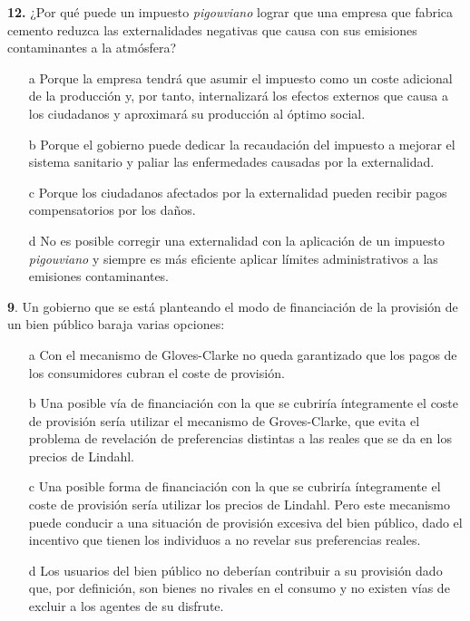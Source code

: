 \documentclass{nuevotema}
\begin{document}
\preguntas


\textbf{12.} ¿Por qué puede un impuesto \textit{pigouviano} lograr que una empresa que fabrica cemento reduzca las externalidades negativas que causa con sus emisiones contaminantes a la atmósfera?

\begin{itemize}
	\item[a] Porque la empresa tendrá que asumir el impuesto como un coste adicional de la producción y, por tanto, internalizará los efectos externos que causa a los ciudadanos y aproximará su producción al óptimo social.
	\item[b] Porque el gobierno puede dedicar la recaudación del impuesto a mejorar el sistema sanitario y paliar las enfermedades causadas por la externalidad.
	\item[c] Porque los ciudadanos afectados por la externalidad pueden recibir pagos compensatorios por los daños.
	\item[d] No es posible corregir una externalidad con la aplicación de un impuesto \textit{pigouviano} y siempre es más eficiente aplicar límites administrativos a las emisiones contaminantes.
\end{itemize}


\textbf{9}. Un gobierno que se está planteando el modo de financiación de la provisión de un bien público baraja varias opciones:

\begin{itemize}
	\item[a] Con el mecanismo de Gloves-Clarke no queda garantizado que los pagos de los consumidores cubran el coste de provisión.
	\item[b] Una posible vía de financiación con la que se cubriría íntegramente el coste de provisión sería utilizar el mecanismo de Groves-Clarke, que evita el problema de revelación de preferencias distintas a las reales que se da en los precios de Lindahl.
	\item[c] Una posible forma de financiación con la que se cubriría íntegramente el coste de provisión sería utilizar los precios de Lindahl. Pero este mecanismo puede conducir a una situación de provisión excesiva del bien público, dado el incentivo que tienen los individuos a no revelar sus preferencias reales.
	\item[d] Los usuarios del bien público no deberían contribuir a su provisión dado que, por definición, son bienes no rivales en el consumo y no existen vías de excluir a los agentes de su disfrute. 
\end{itemize}
\end{document}
